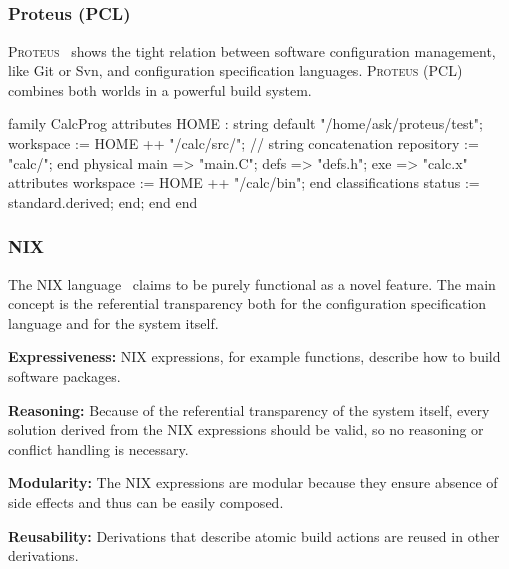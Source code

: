 \subsection{}

\begin{frame}[fragile]
	\frametitle{Proteus (PCL)}
	\textsc{Proteus}~\cite{tryggeseth1995modelling} shows the tight relation between software configuration management, like Git or Svn, and configuration specification languages.
	\textsc{Proteus} (PCL) combines both worlds in a powerful build system.

	\begin{code}[basicstyle=\tiny,morekeywords={family,attributes,end,physical,default,classifications},gobble=4,language=]
	family CalcProg
		attributes
			HOME : string default "/home/ask/proteus/test";
			workspace := HOME ++ "/calc/src/"; // string concatenation
			repository := "calc/";
			end
		physical
			main => "main.C";
			defs => "defs.h";
			exe => "calc.x" attributes workspace := HOME ++ "/calc/bin"; end
			classifications status := standard.derived; end;
		end
	end
	\end{code}
\end{frame}

\begin{frame}
	\frametitle{NIX}

	The NIX language~\cite{dolstra2007purely} claims to be purely functional as a novel feature.
	The main concept is the referential transparency both for the configuration specification language and for the system itself.

	\textbf{Expressiveness:}
	NIX expressions, for example functions, describe how to build software packages.

	\textbf{Reasoning:}
	Because of the referential transparency of the system itself, every solution derived from the NIX expressions should be valid, so no reasoning or conflict handling is necessary.

	\textbf{Modularity:}
	The NIX expressions are modular because they ensure absence of side effects and thus can be easily composed.

	\textbf{Reusability:}
	Derivations that describe atomic build actions are reused in other derivations.
\end{frame}

